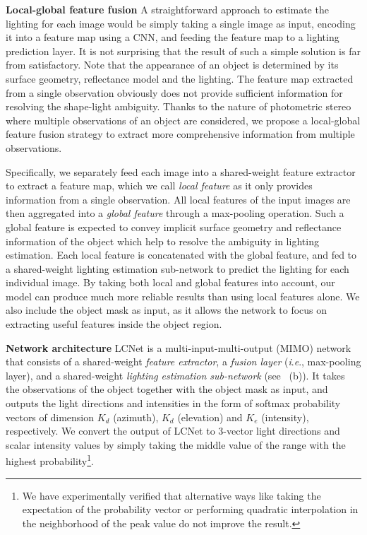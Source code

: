 \documentclass[10pt,journal,compsoc]{IEEEtran}
\newcommand{\ie}{\textit{i}.\textit{e}.}
\newcommand{\rev}[1]{#1}
\renewcommand{\paragraph}[1]{\vspace{0.2em}\noindent \textbf{#1 \hspace{0.2em}}}
\begin{document}
\paragraph{Local-global feature fusion}
A straightforward approach to estimate the lighting for each image would be simply taking a single image as input, encoding it into a feature map using a CNN, and feeding the feature map to a lighting prediction layer. It is not surprising that the result of such a simple solution is far from satisfactory. Note that the appearance of an object is determined by its surface geometry, reflectance model and the lighting. The feature map extracted from a single observation obviously does not provide sufficient information for resolving the shape-light ambiguity. Thanks to the nature of photometric stereo where multiple observations of an object are considered, we propose a local-global feature fusion strategy to extract more comprehensive information from multiple observations.

Specifically, we separately feed each image into a shared-weight feature extractor to extract a feature map, which we call \emph{local feature} as it only provides information from a single observation. All local features of the input images are then aggregated into a \emph{global feature} through a max-pooling operation.
Such a global feature is expected to convey implicit surface geometry and reflectance information of the object which help to resolve the ambiguity in lighting estimation. Each local feature is concatenated with the global feature, and fed to a shared-weight lighting estimation sub-network to predict the lighting for each individual image. By taking both local and global features into account, our model can produce much more reliable results than using local features alone. 
\rev{We also include the object mask as input, as it allows the network to focus on extracting useful features inside the object region.}

\paragraph{Network architecture}
LCNet is a multi-input-multi-output (MIMO) network that consists of a shared-weight \emph{feature extractor}, a \emph{fusion layer} (\ie, max-pooling layer), and a shared-weight \emph{lighting estimation sub-network} (see ~(b)). 
It takes the observations of the object together with the object mask as input, and outputs the light directions and intensities in the form of softmax probability vectors of dimension $K_d$ (azimuth), $K_d$ (elevation) and $K_e$ (intensity), respectively. 
We convert the output of LCNet to $3$-vector light directions and scalar intensity values by simply taking the middle value of the range with the highest probability\footnote{We have experimentally verified that alternative ways like taking the expectation of the probability vector or performing quadratic interpolation in the neighborhood of the peak value do not improve the result.}.
\end{document}
